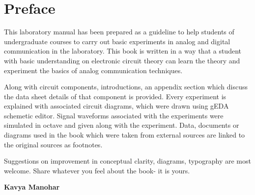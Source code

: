 \chapter*{Preface} 

This laboratory manual has been prepared as a guideline to help students of undergraduate courses to carry out basic experiments in analog and digital communication in the laboratory. This book is written in a way that a student with basic understanding on electronic circuit theory can learn the theory and experiment the basics of analog communication techniques.

Along with circuit components, introductions, an appendix section which discuss the data sheet details of that component is provided. Every experiment is explained with associated circuit diagrams, which were drawn using gEDA schemetic editor. Signal waveforms associated with the experiments were simulated in octave and given along with the experiment. Data, documents or diagrams used in the book which were taken from external sources are linked to the original sources as footnotes.

Suggestions on improvement in conceptual clarity, diagrams, typography are most welcome. Share whatever you feel about the book- it is yours.

\begin{flushright}
\textbf{Kavya Manohar}
\end{flushright}